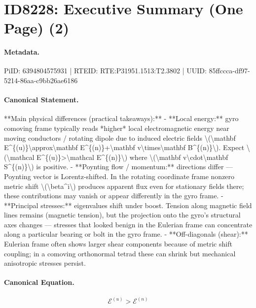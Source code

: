 \section*{ID8228: Executive Summary (One Page) (2)}
\paragraph{Metadata.}
PiID: 6394804575931 | RTEID: RTE:P31951.1513:T2.3802 | UUID: 85ffccca-df97-5214-86aa-c9bb26ae6186

\paragraph{Canonical Statement.}
**Main physical differences (practical takeaways):** - **Local energy:** gyro comoving frame typically reads *higher* local electromagnetic energy near moving conductors / rotating dipole due to induced electric fields \textbackslash{}(\textbackslash{}mathbf E\textasciicircum{}\{(u)\}\textbackslash{}approx\textbackslash{}mathbf E\textasciicircum{}\{(n)\}+\textbackslash{}mathbf v\textbackslash{}times\textbackslash{}mathbf B\textasciicircum{}\{(n)\}\textbackslash{}). Expect \textbackslash{}(\textbackslash{}mathcal E\textasciicircum{}\{(u)\}>\textbackslash{}mathcal E\textasciicircum{}\{(n)\}\textbackslash{}) where \textbackslash{}(\textbackslash{}mathbf v\textbackslash{}cdot\textbackslash{}mathbf S\textasciicircum{}\{(n)\}\textbackslash{}) is positive. - **Poynting flow / momentum:** directions differ — Poynting vector is Lorentz-shifted. In the rotating coordinate frame nonzero metric shift \textbackslash{}(\textbackslash{}beta\textasciicircum{}i\textbackslash{}) produces apparent flux even for stationary fields there; these contributions may vanish or appear differently in the gyro frame. - **Principal stresses:** eigenvalues shift under boost. Tension along magnetic field lines remains (magnetic tension), but the projection onto the gyro’s structural axes changes — stresses that looked benign in the Eulerian frame can concentrate along a particular bearing or bolt in the gyro frame. - **Off-diagonals (shear):** Eulerian frame often shows larger shear components because of metric shift coupling; in a comoving orthonormal tetrad these can shrink but mechanical anisotropic stresses persist.

\paragraph{Canonical Equation.}
\[
\mathcal E^{(u)}>\mathcal E^{(n)}
\]

